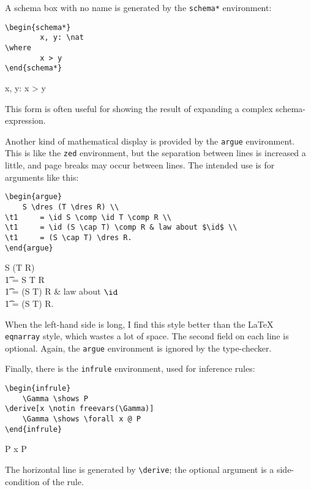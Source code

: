 \documentclass{article}
\def\gives{\endquote\endgroup\egroup}
\begin{document}
A schema box with no name is generated by the %
\verb/schema*/
environment:
\begin{demo}
\begin{verbatim}
\begin{schema*}
        x, y: \nat
\where
        x > y
\end{schema*}
\end{verbatim}
\gives
\begin{schema*}
        x, y: \nat
\where
        x > y
\end{schema*}
\end{demo}
This form is often useful for showing the result of expanding a
complex schema-expression.

Another kind of mathematical display is provided by the %
\verb/argue/
environment.  This is like the %
\verb/zed/ environment, but the
separation between lines is increased a little, and page breaks may
occur between lines.  The intended use is for arguments like this:
\begin{demo}
\begin{verbatim}
\begin{argue}
    S \dres (T \dres R) \\
\t1     = \id S \comp \id T \comp R \\
\t1     = \id (S \cap T) \comp R & law about $\id$ \\
\t1     = (S \cap T) \dres R.
\end{argue}
\end{verbatim}
\gives
\begin{argue}
    S \dres (T \dres R) \\
\t1     = \id S \comp \id T \comp R \\
\t1     = \id (S \cap T) \comp R & law about $\id$ \\
\t1	= (S \cap T) \dres R.
\end{argue}
\end{demo}
When the left-hand side is long, I find this style better than the
\LaTeX\ %
\verb/eqnarray/ style, which wastes a lot of space. The second
field on each line is optional. Again, the %
\verb/argue/ environment is
ignored by the type-checker.

Finally, there is the %
\verb/infrule/ environment, used for inference
rules:
\begin{demo}
\begin{verbatim}
\begin{infrule}
    \Gamma \shows P
\derive[x \notin freevars(\Gamma)]
    \Gamma \shows \forall x @ P
\end{infrule}
\end{verbatim}
\gives
\begin{infrule}
    \Gamma \shows P
    \Gamma \shows \forall x \spot P
\end{infrule}
\end{demo}
The horizontal line is generated by %
\verb/\derive/; the optional
argument is a side-condition of the rule.
\end{document}
